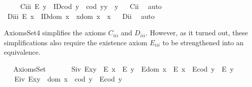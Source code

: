 \begin{isabellebody}
\isadelimproof
%
\endisadelimproof
\isanewline
\ \ \ \isamarkupfalse%
\ C\isactrlsub i\isactrlsub i\isactrlsub i{\isacharcolon}\ {\isachardoublequoteopen}E\ y\ \isactrlbold {\isasymrightarrow}\ {\isacharparenleft}ID{\isacharparenleft}cod\ y{\isacharparenright}\ \isactrlbold {\isasymand}\ {\isacharparenleft}cod\ y{\isacharparenright}{\isasymcdot}y\ {\isasymcong}\ y{\isacharparenright}{\isachardoublequoteclose}%
\isadelimproof
\ %
\endisadelimproof
%
\isatagproof
{}\isamarkupfalse%
\ C\isactrlsub i\isactrlsub i\ \isamarkupfalse%
\ auto%
\endisatagproof
{\isafoldproof}%
%
\isadelimproof
%
\endisadelimproof
\isanewline
\ \ \ \isamarkupfalse%
\ D\isactrlsub i\isactrlsub i\isactrlsub i{\isacharcolon}\ {\isachardoublequoteopen}E\ x\ \isactrlbold {\isasymrightarrow}\ {\isacharparenleft}ID{\isacharparenleft}dom\ x{\isacharparenright}\ \isactrlbold {\isasymand}\ x{\isasymcdot}{\isacharparenleft}dom\ x{\isacharparenright}\ {\isasymcong}\ x{\isacharparenright}{\isachardoublequoteclose}%
\isadelimproof
\ %
\endisadelimproof
%
\isatagproof
{}\isamarkupfalse%
\ D\isactrlsub i\isactrlsub i\ \isamarkupfalse%
\ auto%
\endisatagproof
{\isafoldproof}%
%
\isadelimproof
%
\endisadelimproof
\isanewline
\ \ \isamarkupfalse%
%
\isamarkuptrue%
%
\begin{isamarkuptext}%
AxiomsSet4 simplifies the axioms $C_{iii}$ and  $D_{iii}$. However, as it turned 
       out, these simplifications also require the existence axiom $E_{iii}$ to be strengthened 
       into an equivalence.%
\end{isamarkuptext}\isamarkuptrue%
\ \isamarkupfalse%
\ AxiomsSet{}\ {\isacharequal}\isanewline
\ \ \isanewline
\ \ \ S\isactrlsub i\isactrlsub v{\isacharcolon}\ {\isachardoublequoteopen}{\isacharparenleft}E{\isacharparenleft}x{\isasymcdot}y{\isacharparenright}\ \isactrlbold {\isasymrightarrow}\ {\isacharparenleft}E\ x\ \isactrlbold {\isasymand}\ E\ y{\isacharparenright}{\isacharparenright}\ \isactrlbold {\isasymand}\ {\isacharparenleft}E{\isacharparenleft}dom\ x{\isacharparenright}\ \isactrlbold {\isasymrightarrow}\ E\ x{\isacharparenright}\ \isactrlbold {\isasymand}\ {\isacharparenleft}E{\isacharparenleft}cod\ y{\isacharparenright}\ \isactrlbold {\isasymrightarrow}\ E\ y{\isacharparenright}{\isachardoublequoteclose}\ \ \isanewline
\ \ \ E\isactrlsub i\isactrlsub v{\isacharcolon}\ {\isachardoublequoteopen}E{\isacharparenleft}x{\isasymcdot}y{\isacharparenright}\ \isactrlbold {\isasymleftrightarrow}\ {\isacharparenleft}dom\ x\ {\isasymcong}\ cod\ y\ \isactrlbold {\isasymand}\ E{\isacharparenleft}cod\ y{\isacharparenright}{\isacharparenright}{\isachardoublequoteclose}\ \isanewline

\end{isabellebody}
